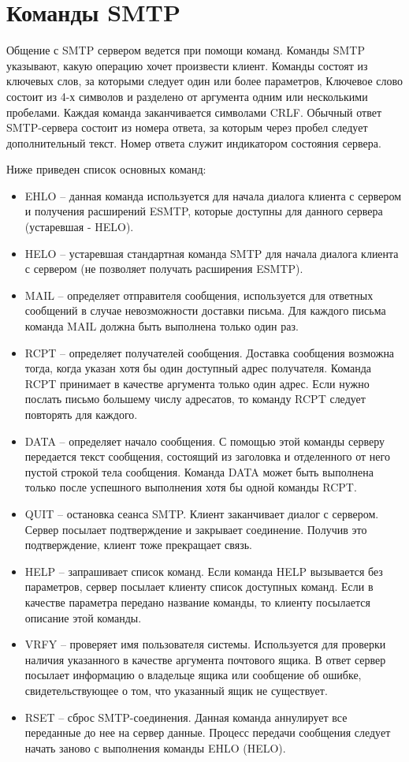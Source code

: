 \documentclass[a4paper,12pt]{report}
\begin{document}
	 \section{Команды SMTP}

	 Общение с SMTP сервером ведется при помощи команд. Команды SMTP указывают, какую операцию хочет произвести клиент. Команды состоят из ключевых слов, за которыми следует один или более параметров, Ключевое слово состоит из 4-х символов и разделено от аргумента одним или несколькими пробелами. Каждая команда заканчивается символами CRLF. Обычный ответ SMTP-сервера состоит из номера ответа, за которым через пробел следует дополнительный текст. Номер ответа служит индикатором состояния сервера.

	Ниже приведен список основных команд:

	 \begin{itemize}
		 \item EHLO -- данная команда используется для начала диалога клиента с сервером и получения расширений ESMTP, которые доступны для данного сервера (устаревшая - HELO).
		 \item HELO -- устаревшая стандартная команда SMTP для начала диалога клиента с сервером (не позволяет получать расширения ESMTP).
		 \item MAIL -- определяет отправителя сообщения, используется для ответных сообщений в случае невозможности доставки письма. Для каждого письма команда MAIL должна быть выполнена только один раз.
		 \item RCPT -- определяет получателей сообщения. Доставка сообщения возможна тогда, когда указан хотя бы один доступный адрес получателя. Команда RCPT принимает в качестве аргумента только один адрес. Если нужно послать письмо большему числу адресатов, то команду RCPT следует повторять для каждого.
		 \item DATA -- определяет начало сообщения. С помощью этой команды серверу передается текст сообщения, состоящий из заголовка и отделенного от него пустой строкой тела сообщения. Команда DATA может быть выполнена только после успешного выполнения хотя бы одной команды RCPT.
		 \item QUIT -- остановка сеанса SMTP. Клиент заканчивает диалог с сервером. Сервер посылает подтверждение и закрывает соединение. Получив это подтверждение, клиент тоже прекращает связь.
		 \item HELP -- запрашивает список команд. Если команда HELP вызывается без параметров, сервер посылает клиенту список доступных команд. Если в качестве параметра передано название команды, то клиенту посылается описание этой команды.
		 \item VRFY -- проверяет имя пользователя системы. Используется для проверки наличия указанного в качестве аргумента почтового ящика. В ответ сервер посылает информацию о владельце ящика или сообщение об ошибке, свидетельствующее о том, что указанный ящик не существует.
		 \item RSET -- сброс SMTP-соединения. Данная команда аннулирует все переданные до нее на сервер данные. Процесс передачи сообщения следует начать заново с выполнения команды EHLO (HELO).
	 \end{itemize}
\end{document}
